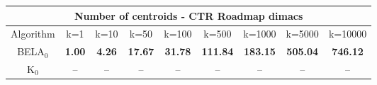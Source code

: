 \begin{tabular}{c|cccccccc}\toprule
\multicolumn{9}{c}{Number of centroids - CTR Roadmap dimacs}\\ \midrule
Algorithm & k=1 & k=10 & k=50 & k=100 & k=500 & k=1000 & k=5000 & k=10000 \\ \midrule
BELA$_0$ & \textbf{1.00} & \textbf{4.26} & \textbf{17.67} & \textbf{31.78} & \textbf{111.84} & \textbf{183.15} & \textbf{505.04} & \textbf{746.12} \\
K$_0$ & -- & -- & -- & -- & -- & -- & -- & -- \\ \bottomrule 
\end{tabular}
